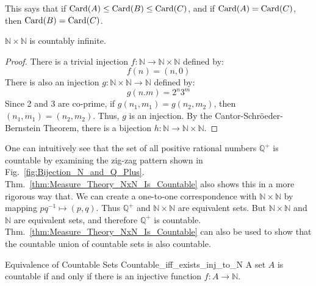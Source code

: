             \par\hfill\par
            This says that if $\operatorname{Card}(A)\leq\operatorname{Card}(B)\leq\operatorname{Card}(C)$,
            and if $\operatorname{Card}(A)=\operatorname{Card}(C)$, then $\operatorname{Card}(B)=\operatorname{Card}(C)$.
            \begin{theorem}
                \label{thm:Measure_Theory_NxN_Is_Countable}
                $\mathbb{N}\times\mathbb{N}$ is countably infinite.
            \end{theorem}
            \begin{proof}
                There is a trivial injection
                $f:\mathbb{N}\rightarrow\mathbb{N}\times\mathbb{N}$
                defined by:
                \begin{equation}
                    f(n)=(n,0)
                \end{equation}
                There is also an injection
                $g:\mathbb{N}\times\mathbb{N}\rightarrow\mathbb{N}$
                defined by:
                \begin{equation}
                    g(n.m)=2^{n}3^{m}
                \end{equation}
                Since 2 and 3 are co-prime, if
                $g(n_{1},m_{1})=g(n_{2},m_{2})$, then
                $(n_{1},m_{1})=(n_{2},m_{2})$. Thus, $g$ is an injection.
                By the Cantor-Schr\"{o}eder-Bernstein Theorem, there is a
                bijection $h:\mathbb{N}\rightarrow\mathbb{N}\times\mathbb{N}$.
            \end{proof}
            One can intuitively see that the set of all positive
            rational numbers $\mathbb{Q}^{+}$ is countable by examining
            the zig-zag pattern shown in
            Fig.~\ref{fig:Bijection_N_and_Q_Plus}.
            Thm.~\ref{thm:Measure_Theory_NxN_Is_Countable} also
            shows this in a more rigorous way that. We can create
            a one-to-one correspondence with
            $\mathbb{N}\times\mathbb{N}$ by mapping
            $pq^{\minus{1}}\mapsto(p,q)$. Thus $\mathbb{Q}^{+}$
            and $\mathbb{N}\times\mathbb{N}$ are equivalent sets.
            But $\mathbb{N}\times\mathbb{N}$ and $\mathbb{N}$
            are equivalent sets, and therefore $\mathbb{Q}^{+}$
            is countable.
            Thm.~\ref{thm:Measure_Theory_NxN_Is_Countable} can also be used
            to show that the countable union of countable sets is also
            countable.
            \begin{ltheorem}{Equivalence of Countable Sets}
                  {Countable_iff_exists_inj_to_N}
                A set $A$ is countable if and only if there is an injective
                function $f:A\rightarrow\mathbb{N}$.
            \end{ltheorem}
